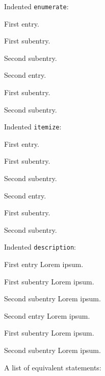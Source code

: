 \noindent
Indented \texttt{enumerate}:
\begin{enumerate*}
  \item
    First entry.
    \begin{enumerate*}
      \item
        First subentry.
      \item
        Second subentry.
    \end{enumerate*}
  \item
    Second entry.
    \begin{enumerate*}
      \item
        First subentry.
      \item
        Second subentry.
    \end{enumerate*}
\end{enumerate*}
Indented \texttt{itemize}:
\begin{itemize*}
  \item
    First entry.
    \begin{itemize*}
      \item
        First subentry.
      \item
        Second subentry.
      \end{itemize*}
  \item
    Second entry.
    \begin{itemize*}
      \item
        First subentry.
      \item
        Second subentry.
    \end{itemize*}
\end{itemize*}
Indented \texttt{description}:
\begin{description*}
  \item[First entry]
    Lorem ipsum.
    \begin{description*}
      \item[First subentry]
        Lorem ipsum.
      \item[Second subentry]
        Lorem ipsum.
    \end{description*}
  \item[Second entry]
    Lorem ipsum.
    \begin{description*}
      \item[First subentry]
        Lorem ipsum.
      \item[Second subentry]
        Lorem ipsum.
    \end{description*}
\end{description*}
A list of equivalent statements:
